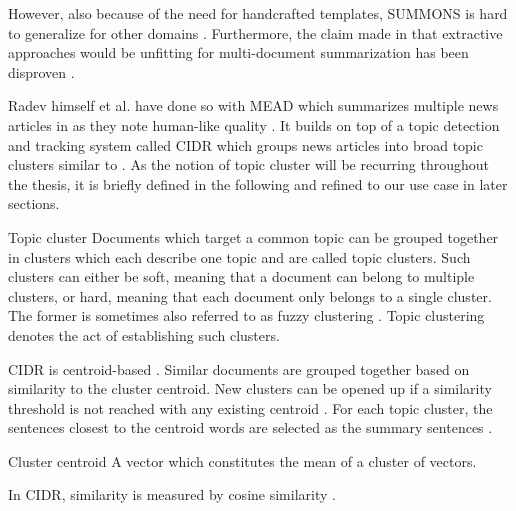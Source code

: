 However, also because of the need for handcrafted templates, SUMMONS is hard to generalize for other domains \cite{Das07asurvey}. Furthermore, the claim made in \cite{McKeown:1995:GSM:215206.215334} that extractive approaches would be unfitting for multi-document summarization has been disproven \cite{Das07asurvey}. \par
Radev himself et al. \cite{DBLP:journals/corr/cs-CL-0005020} have done so with MEAD \label{MEAD} which summarizes multiple news articles in as they note human-like quality \cite{DBLP:journals/corr/cs-CL-0005020}.
It builds on top of a topic detection and tracking system called CIDR \cite{Radev1999ADO} which groups news articles into broad topic clusters similar to \cite{DBLP:conf/cikm/MaSYC12, llewellyn_grover_oberlander, DBLP:conf/icwsm/KhabiriCH11, DBLP:conf/ecir/AkerKBPBHG16}. As the notion of topic cluster will be recurring throughout the thesis, it is briefly defined in the following and refined to our use case in later sections.
\begin{definition}{Topic cluster}
\label{tcdef}
Documents which target a common topic can be grouped together in clusters which each describe one topic and are called topic clusters. Such clusters can either be soft, meaning that a document can belong to multiple clusters, or hard, meaning that each document only belongs to a single cluster. The former is sometimes also referred to as fuzzy clustering \cite{DBLP:conf/ecir/AkerKBPBHG16}. Topic clustering denotes the act of establishing such clusters.
\end{definition}
CIDR is centroid-based \cite{Das07asurvey, Wan:2008:MSU:1390334.1390386}. Similar documents are grouped together based on similarity to the cluster centroid. New clusters can be opened up if a similarity threshold is not reached with any existing centroid \cite{Radev1999ADO}.
For each topic cluster, the sentences closest to the centroid words are selected as the summary sentences \cite{DBLP:journals/corr/cs-CL-0005020}.
\begin{definition}{Cluster centroid} A vector which constitutes the mean of a cluster of vectors.
\end{definition}
In CIDR, similarity is measured by cosine similarity \cite{Radev1999ADO}.

